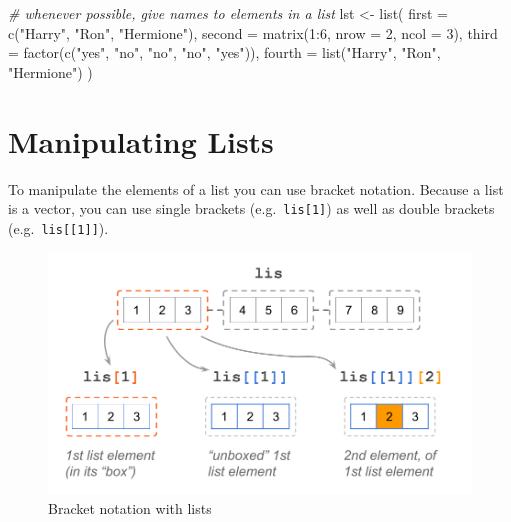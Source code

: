 \documentclass[
]{book}
\newenvironment{Shaded}{\begin{snugshade}}{\end{snugshade}}
\newcommand{\AttributeTok}[1]{\textcolor[rgb]{0.77,0.63,0.00}{#1}}
\newcommand{\CommentTok}[1]{\textcolor[rgb]{0.56,0.35,0.01}{\textit{#1}}}
\newcommand{\DecValTok}[1]{\textcolor[rgb]{0.00,0.00,0.81}{#1}}
\newcommand{\FunctionTok}[1]{\textcolor[rgb]{0.00,0.00,0.00}{#1}}
\newcommand{\NormalTok}[1]{#1}
\newcommand{\OtherTok}[1]{\textcolor[rgb]{0.56,0.35,0.01}{#1}}
\newcommand{\SpecialCharTok}[1]{\textcolor[rgb]{0.00,0.00,0.00}{#1}}
\newcommand{\StringTok}[1]{\textcolor[rgb]{0.31,0.60,0.02}{#1}}
\begin{document}
\begin{Shaded}
\begin{Highlighting}[]
\CommentTok{\# whenever possible, give names to elements in a list}
\NormalTok{lst }\OtherTok{\textless{}{-}} \FunctionTok{list}\NormalTok{(}
  \AttributeTok{first =} \FunctionTok{c}\NormalTok{(}\StringTok{"Harry"}\NormalTok{, }\StringTok{"Ron"}\NormalTok{, }\StringTok{"Hermione"}\NormalTok{),}
  \AttributeTok{second =} \FunctionTok{matrix}\NormalTok{(}\DecValTok{1}\SpecialCharTok{:}\DecValTok{6}\NormalTok{, }\AttributeTok{nrow =} \DecValTok{2}\NormalTok{, }\AttributeTok{ncol =} \DecValTok{3}\NormalTok{),}
  \AttributeTok{third =} \FunctionTok{factor}\NormalTok{(}\FunctionTok{c}\NormalTok{(}\StringTok{"yes"}\NormalTok{, }\StringTok{"no"}\NormalTok{, }\StringTok{"no"}\NormalTok{, }\StringTok{"no"}\NormalTok{, }\StringTok{"yes"}\NormalTok{)),}
  \AttributeTok{fourth =} \FunctionTok{list}\NormalTok{(}\StringTok{"Harry"}\NormalTok{, }\StringTok{"Ron"}\NormalTok{, }\StringTok{"Hermione"}\NormalTok{)}
\NormalTok{)}
\end{Highlighting}
\end{Shaded}

\hypertarget{manipulating-lists}{%
\section{Manipulating Lists}\label{manipulating-lists}}

To manipulate the elements of a list you can use bracket notation. Because a
list is a vector, you can use single brackets (e.g.~\texttt{lis{[}1{]}}) as well as
double brackets (e.g.~\texttt{lis{[}{[}1{]}{]}}).

\begin{figure}

{\centering \includegraphics[width=0.75\linewidth]{images/objects/obj-list-brackets1} 

}

\caption{Bracket notation with lists}\label{fig:unnamed-chunk-118}
\end{figure}
\end{document}
